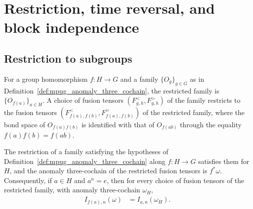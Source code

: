 \section{Restriction, time reversal, and block independence}

\subsection{Restriction to subgroups}

\begin{definition}
    \label{def:mpug_family_restriction}
    \leanok
    For a group homomorphism $f\colon H\to G$ and a family
    $\{O_g\}_{g\in G}$ as in Definition~\ref{def:mpug_anomaly_three_cochain},
    the restricted family is $\{O_{f(a)}\}_{a\in H}$. A choice of fusion
    tensors $(F^<_{g,h},F^>_{g,h})$ of the family restricts to the fusion
    tensors $(F^<_{f(a),f(b)},F^>_{f(a),f(b)})$ of the restricted family,
    where the bond space of $O_{f(a)f(b)}$ is identified with that of
    $O_{f(ab)}$ through the equality $f(a)f(b)=f(ab)$.
\end{definition}

\begin{lemma}
    \label{thm:mpug_family_restriction_omega}
    \leanok
    The restriction of a family satisfying the hypotheses of
    Definition~\ref{def:mpug_anomaly_three_cochain} along $f\colon H\to G$
    satisfies them for $H$, and the anomaly three-cochain of the restricted
    fusion tensors is $f^*\omega$. Consequently, if $a\in H$ and $a^n=e$,
    then for every choice of fusion tensors of the restricted family, with
    anomaly three-cochain $\omega_H$,
    \begin{align}
        I_{f(a),n}(\omega) & =I_{a,n}(\omega_H).
    \end{align}
\end{lemma}

